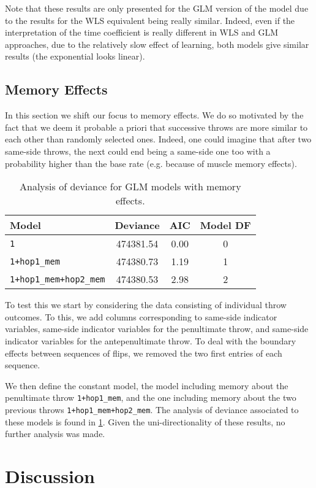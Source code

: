 \documentclass[a4paper, 12pt,oneside]{article}
\begin{document}
			Note that these results are only presented for the GLM version of the model due to the results for the WLS equivalent being really similar. Indeed, even if the interpretation of the time coefficient is really different in WLS and GLM approaches, due to the relatively slow effect of learning, both models give similar results (the exponential looks linear).    
		\subsection{Memory Effects}
			In this section we shift our focus to memory effects. We do so motivated by the fact that we deem it probable a priori that successive throws are more similar to each other than randomly selected ones. Indeed, one could imagine that after two same-side throws, the next could end being a same-side one too with a probability higher than the base rate (e.g. because of muscle memory effects). 
			\begin{table}[htb]
				\centering
				\caption{Analysis of deviance for GLM models with memory effects.}
				\label{tab:memory-model-comparison}
				\begin{tabular}{lccc}
				\toprule
				Model & Deviance & AIC & Model DF \\
				\midrule
				\texttt{1} & 474381.54 & 0.00 & 0 \\
				\texttt{1+hop1\_mem} & 474380.73 & 1.19 & 1 \\
				\texttt{1+hop1\_mem+hop2\_mem} & 474380.53 & 2.98 & 2 \\
				\bottomrule
				\end{tabular}
			\end{table}

			To test this we start by considering the data consisting of individual throw outcomes. To this, we add columns corresponding to same-side indicator variables, same-side indicator variables for the penultimate throw, and same-side indicator variables for the antepenultimate throw.
			To deal with the boundary effects between sequences of flips, we removed the two first entries of each sequence. 
			
			We then define the constant model, the model including memory about the penultimate throw \texttt{1+hop1\_mem}, and the one including memory about the two previous throws \texttt{1+hop1\_mem+hop2\_mem}. The analysis of deviance associated to these models is found in \ref{tab:memory-model-comparison}. Given the uni-directionality of these results, no further analysis was made.  
	\section{Discussion}
\end{document}
